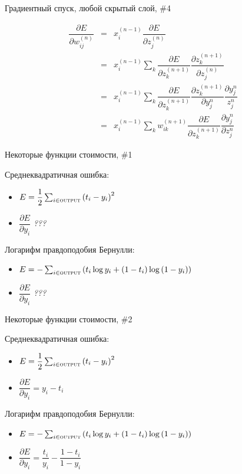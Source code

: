 \documentclass[10pt]{beamer}
\begin{document}
\begin{frame}{Градиентный спуск, любой скрытый слой, \#4}

\begin{eqnarray*}
	\dfrac{\partial E}{\partial w^{(n)}_{ij}} &=& x^{(n - 1)}_i \dfrac{\partial E}{\partial z^{(n)}_j} \\
	&=& x^{(n - 1)}_i \sum_k \dfrac{\partial E}{\partial z^{(n + 1)}_k} \dfrac{\partial z^{(n + 1)}_k}{\partial z^{(n)}_j} \\
	&=& x^{(n - 1)}_i \sum_k \dfrac{\partial E}{\partial z^{(n + 1)}_k} \dfrac{\partial z^{(n + 1)}_k}{\partial y^{n}_{j}} \dfrac{\partial y^{n}_{j}}{z^{n}_{j}} \\
	&=& x^{(n - 1)}_i \sum_k w^{(n + 1)}_{ik} \dfrac{\partial E}{\partial z^{(n + 1)}_k}  \dfrac{\partial y^{n}_{j}}{\partial z^{n}_{j}}
\end{eqnarray*}

\end{frame}


\begin{frame}{Некоторые функции стоимости, \#1}

Среднеквадратичная ошибка:
\begin{itemize}
	\item $E = \dfrac{1}{2} \sum_{i \in \textsc{output}} \left( t_i - y_i \right)^2$
	\item $\dfrac{\partial E}{\partial y_i}$ \textit{???}
\end{itemize}

Логарифм правдоподобия Бернулли: 
\begin{itemize}
	\item $E = -\sum_{i \in \textsc{output}} \left( t_i \log y_i + \left( 1 - t_i \right) \log\left( 1 - y_i \right) \right)$
	\item $\dfrac{\partial E}{\partial y_i}$ \textit{???}
\end{itemize}


\end{frame}


\begin{frame}{Некоторые функции стоимости, \#2}

Среднеквадратичная ошибка:
\begin{itemize}
	\item $E = \dfrac{1}{2} \sum_{i \in \textsc{output}} \left( t_i - y_i \right)^2$
	\item $\dfrac{\partial E}{\partial y_i} = y_i - t_i$
\end{itemize}

Логарифм правдоподобия Бернулли: 
\begin{itemize}
	\item $E = -\sum_{i \in \textsc{output}} \left( t_i \log y_i + \left( 1 - t_i \right) \log\left( 1 - y_i \right) \right)$
	\item $\dfrac{\partial E}{\partial y_i} = \dfrac{t_i}{y_i} - \dfrac{1 - t_i}{1 - y_i}$
\end{itemize}


\end{frame}
\end{document}

